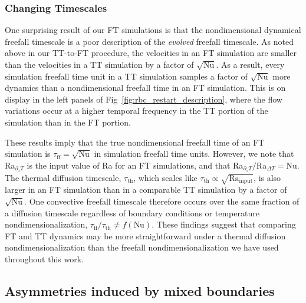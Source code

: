 \documentclass[aps, pre, onecolumn, nofootinbib, notitlepage, groupedaddress, amsfonts, amssymb, amsmath, longbibliography, superscriptaddress]{revtex4-1}
\begin{document}
\subsubsection{Changing Timescales}
\label{sec:timescales}
One surprising result of our FT simulations is that the nondimensional dynamical freefall timescale is a poor description of the \emph{evolved} freefall timescale.
As noted above in our TT-to-FT procedure, the velocities in an FT simulation are smaller than the velocities in a TT simulation by a factor of $\sqrt{\text{Nu}}$.
As a result, every simulation freefall time unit in a TT simulation samples a factor of $\sqrt{\text{Nu}}$ more dynamics than a nondimensional freefall time in an FT simulation.
This is on display in the left panels of Fig~\ref{fig:rbc_restart_description}, where the flow variations occur at a higher temporal frequency in the TT portion of the simulation than in the FT portion.

These results imply that the true nondimensional freefall time of an FT simulation is $\tau_{\text{ff}} = \sqrt{\text{Nu}}$ in simulation freefall time units.
However, we note that Ra$_{\partial_z T}$ is the input value of Ra for an FT simulations, and that Ra$_{\partial_z T}/$Ra$_{\Delta T} = \text{Nu}$.
The thermal diffusion timescale, $\tau_{\text{th}}$, which scales like $\tau_{\text{th}} \propto \sqrt{\text{Ra}_{\text{input}}}$, is also larger in an FT simulation than in a comparable TT simulation by a factor of $\sqrt{\text{Nu}}$.
One convective freefall timescale therefore occurs over the same fraction of a diffusion timescale regardless of boundary conditions or temperature nondimensionalization, $\tau_{\text{ff}}/\tau_{\text{th}} \neq f(\text{Nu})$.
These findings suggest that comparing FT and TT dynamics may be more straightforward under a thermal diffusion nondimensionalization \cite{goluskin2016} than the freefall nondimensionalization we have used throughout this work.

\subsection{Asymmetries induced by mixed boundaries}
\label{sec:asymmetries}
\end{document}
